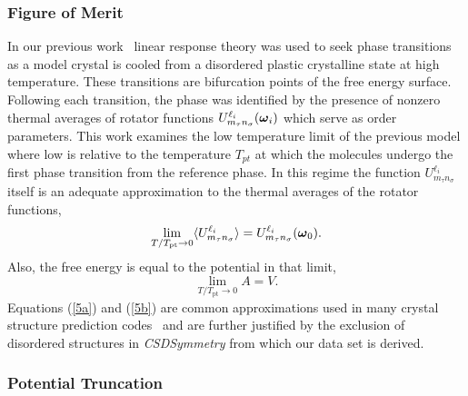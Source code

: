 \documentclass[preprint]{revtex4}
\newcommand{\mb}[1]{\ensuremath{\mbox{\boldmath $ #1 $}}}
\newcommand{\av}[1]{\ensuremath{\langle #1 \rangle}}
\begin{document}
\subsubsection{Figure of Merit}

In our previous work~\cite{Keith04c,Mettes04} linear response theory
was used to seek phase transitions as a model crystal is cooled from
a disordered plastic crystalline state at high temperature. These
transitions are bifurcation points of the free energy surface.
Following each transition, the phase was identified by the presence
of nonzero thermal averages of rotator functions $U^{\ell_i}_{m_\tau
n_\sigma}(\mb{\omega}_i)$ which serve as order parameters. This work
examines the low temperature limit of the previous model where low
is relative to the temperature $T_{pt}$ at which the molecules
undergo the first
phase transition from the reference phase. %
In this regime the function $U^{\ell_i}_{m_\tau n_\sigma}$ itself is
an adequate approximation to the thermal averages of the rotator
functions,
\begin{equation}\label{5a}
\lim_{T/T_{\mathrm{pt}}\rightarrow 0}\av{U^{\ell_i}_{m_\tau
n_\sigma}}=U^{\ell_i}_{m_\tau n_\sigma}(\mb{\omega}_0).
\end{equation}
Also, the free energy is equal to the potential in that limit,
\begin{equation}\label{5b}
\lim_{T/T_{\mathrm{pt}}\rightarrow 0}A=V.
\end{equation}
Equations (\ref{5a}) and (\ref{5b}) are common approximations used in
many crystal structure prediction codes~\cite{Verwer98} and are
further justified by the exclusion of disordered structures in
\emph{CSDSymmetry} from which our data set is derived.

\subsubsection{Potential Truncation}
\label{truncation}
\end{document}
